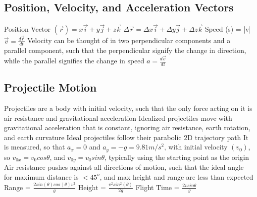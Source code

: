 \documentclass[11 pt, twoside]{article}
\newenvironment{outline*}
{
	\begin{outline}[enumerate]
	}
	{\end{outline}
}
\begin{document}
\subsection{Position, Velocity, and Acceleration Vectors}
\begin{outline*}
\1 Position Vector $(\vec{r}) = x\vec{i} + y\vec{j} + z\vec{k}$
\1 $\Delta \vec{r} = \Delta x\vec{i} + \Delta y\vec{j} + \Delta z\vec{k}$
\1 Speed (s) = |v|
\1 $\vec{v} = \frac{d\vec{r}}{dt}$
\1 Velocity can be thought of in two perpendicular components and a parallel component, such that the perpendicular signify the change in direction, while the parallel signifies the change in speed
\1 $a = \frac{d\vec{v}}{dt}$
\end{outline*}
\subsection{Projectile Motion}
\begin{outline*}
\1 Projectiles are a body with initial velocity, such that the only force acting on it is air resistance and gravitational acceleration
\1 Idealized projectiles move with gravitational acceleration that is constant, ignoring air resistance, earth rotation, and earth curvature
\2 Ideal projectiles follow their parabolic 2D trajectory path
\1 It is measured, so that $a_x = 0$ and $a_y = -g = 9.81 m/s^2$, with initial velocity $(v_0)$, so $v_{0x} = v_0cos\theta$, and $v_{0y} = v_0sin\theta$, typically using the starting point as the origin
\1 Air resistance pushes against all directions of motion, such that the ideal angle for maximum distance is $<45^o$, and max height and range are less than expected
\1 Range = $\frac{2sin(\theta)cos(\theta)v^2}{g}$
\1 Height = $\frac{v^2sin^2(\theta)}{2g}$
\1 Flight Time = $\frac{2vsin\theta}{g}$
\end{outline*}
\end{document}
